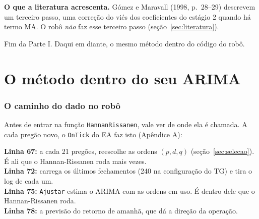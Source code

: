 \documentclass[11pt,a4paper]{article}
\newcommand{\cod}[1]{../../../tg/codigo/#1}
\newcommand{\trecho}[4]{}
\begin{document}
\textbf{O que a literatura acrescenta.} Gómez e Maravall (1998, p.~28--29) descrevem um terceiro passo, uma correção
do viés dos coeficientes do estágio 2 quando há termo MA. O robô \emph{não} faz esse terceiro passo (seção~\ref{sec:literatura}).

\begin{center}
\end{center}

Fim da Parte I. Daqui em diante, o mesmo método dentro do código do robô.

\part{O método dentro do seu ARIMA}

\section{O caminho do dado no robô}\label{sec:caminho}

Antes de entrar na função \texttt{HannanRissanen}, vale ver de onde ela é chamada. A cada pregão novo, o
\texttt{OnTick} do EA faz isto (Apêndice A):

\trecho{\cod{ARIMA_GARCH_EA.mq5}}{60}{80}{tg/codigo/ARIMA\_GARCH\_EA.mq5 (Apêndice A)}

\begin{leitura}
\textbf{Linha 67:} a cada 21 pregões, reescolhe as ordens $(p,d,q)$ (seção~\ref{sec:selecao}). É ali que o
Hannan-Rissanen roda mais vezes.\\
\textbf{Linha 72:} carrega os últimos fechamentos (240 na configuração do TG) e tira o log de cada um.\\
\textbf{Linha 75:} \texttt{Ajustar} estima o ARIMA com as ordens em uso. É dentro dele que o Hannan-Rissanen roda.\\
\textbf{Linha 78:} a previsão do retorno de amanhã, que dá a direção da operação.
\end{leitura}
\end{document}

